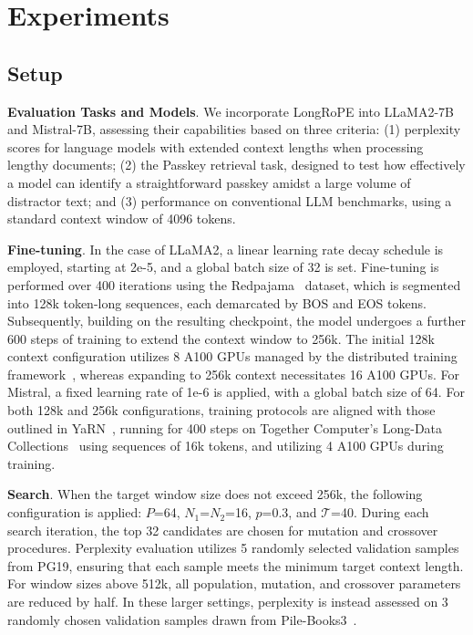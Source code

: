  \section{Experiments}

\label{sec:exp}
\subsection{Setup}
\textbf{Evaluation Tasks and Models}. We incorporate LongRoPE into LLaMA2-7B and Mistral-7B, assessing their capabilities based on three criteria: (1) perplexity scores for language models with extended context lengths when processing lengthy documents; (2) the Passkey retrieval task, designed to test how effectively a model can identify a straightforward passkey amidst a large volume of distractor text; and (3) performance on conventional LLM benchmarks, using a standard context window of 4096 tokens.

\textbf{Fine-tuning}. In the case of LLaMA2, a linear learning rate decay schedule is employed, starting at 2e-5, and a global batch size of 32 is set. Fine-tuning is performed over 400 iterations using the Redpajama~\cite{redpajama} dataset, which is segmented into 128k token-long sequences, each demarcated by BOS and EOS tokens. Subsequently, building on the resulting checkpoint, the model undergoes a further 600 steps of training to extend the context window to 256k. The initial 128k context configuration utilizes 8 A100 GPUs managed by the distributed training framework~\cite{cube}, whereas expanding to 256k context necessitates 16 A100 GPUs. For Mistral, a fixed learning rate of 1e-6 is applied, with a global batch size of 64. For both 128k and 256k configurations, training protocols are aligned with those outlined in YaRN~\cite{yarn}, running for 400 steps on Together Computer’s Long-Data Collections~\cite{mistraldata} using sequences of 16k tokens, and utilizing 4 A100 GPUs during training.

\textbf{Search}. When the target window size does not exceed 256k, the following configuration is applied: $P$=64, $N_1$=$N_2$=16, $p$=0.3, and $\mathcal{T}$=40. During each search iteration, the top 32 candidates are chosen for mutation and crossover procedures. Perplexity evaluation utilizes 5 randomly selected validation samples from PG19, ensuring that each sample meets the minimum target context length. For window sizes above 512k, all population, mutation, and crossover parameters are reduced by half. In these larger settings, perplexity is instead assessed on 3 randomly chosen validation samples drawn from Pile-Books3~\cite{pile}.


